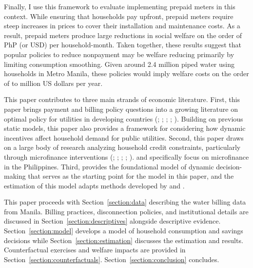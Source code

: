 \documentclass[12pt]{article}
\begin{document}
Finally, I use this framework to evaluate implementing prepaid meters in this context.  While ensuring that households pay upfront, prepaid meters require steep increases in prices to cover their installation and maintenance costs.  As a result, prepaid meters produce large reductions in social welfare on the order of PhP (or USD) per household-month.  Taken together, these results suggest that popular policies to reduce nonpayment may be welfare reducing primarily by limiting consumption smoothing.  Given around 2.4 million piped water using households in Metro Manila, these policies would imply welfare costs on the order of to million US dollars per year. 

This paper contributes to three main strands of economic literature.  First, this paper brings payment and billing policy questions into a growing literature on optimal policy for utilities in developing countries (\cite{mcrae2015infrastructure}; \cite{szabo2015value}; \cite{jack2016charging}; \cite{jack2015pay}; \cite{szabo2015reducing}).  Building on previous static models, this paper also provides a framework for considering how dynamic incentives affect household demand for public utilities.  Second, this paper draws on a large body of research analyzing household credit constraints, particularly through microfinance interventions (\cite{morduch1999microfinance}; \cite{morduch1995income}; \cite{cull2009microfinance}; \cite{dupas2013savings}; \cite{jack2016borrowing}).  \cite{karlan2009expanding} and \cite{gine2014group} specifically focus on microfinance in the Philippines. Third, \cite{deaton1991saving} provides the foundational model of dynamic decision-making that serves as the starting point for the model in this paper, and the estimation of this model adapts methods developed by \cite{gourinchas2002consumption} and \cite{laibson2007estimating}.

This paper proceeds with Section~\ref{section:data} describing the water billing data from Manila.  Billing practices, disconnection policies, and institutional details are discussed in Section~\ref{section:descriptives} alongside descriptive evidence.  Section~\ref{section:model} develops a model of household consumption and savings decisions while Section~\ref{section:estimation} discusses the estimation and results.  Counterfactual exercises and welfare impacts are provided in Section~\ref{section:counterfactuals}.  Section~\ref{section:conclusion} concludes. 
\end{document}

